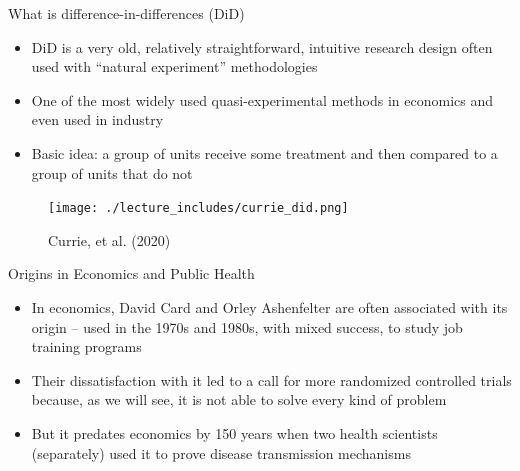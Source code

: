 \documentclass{beamer}
\begin{document}






\begin{frame}{What is difference-in-differences (DiD)}

\begin{itemize}
\item DiD is a very old, relatively straightforward, intuitive research design often used with ``natural experiment'' methodologies
\item One of the most widely used quasi-experimental methods in economics and even used in industry
\item Basic idea: a group of units receive some treatment and then compared to a group of units that do not
\end{itemize}

\end{frame}


\begin{frame}

	\begin{figure}
	\caption{Currie, et al. (2020)}
	\texttt{[image: ./lecture\_includes/currie\_did.png]}
	\end{figure}


\end{frame}








\begin{frame}{Origins in Economics and Public Health}

\begin{itemize}
\item In economics, David Card and Orley Ashenfelter are often associated with its origin -- used in the 1970s and 1980s, with mixed success, to study job training programs
\item Their dissatisfaction with it led to a call for more randomized controlled trials because, as we will see, it is not able to solve every kind of problem
\item But it predates economics by 150 years when two health scientists (separately) used it to prove disease transmission mechanisms

\end{itemize}

\end{frame}
\end{document}
